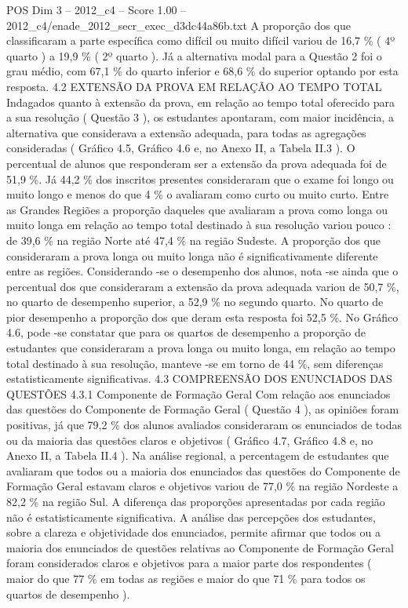 \begin{textsample}{POS Dim 3 – 2012\_c4 – Score 1.00 – 2012\_c4/enade\_2012\_secr\_exec\_d3dc44a86b.txt}
A proporção dos que classificaram a parte específica como difícil ou muito difícil variou de 16,7 \% ( 4º quarto ) a 19,9 \% ( 2º quarto ).
Já a alternativa modal para a Questão 2 foi o grau médio, com 67,1 \% do quarto inferior e 68,6 \% do superior optando por esta resposta. 4.2 EXTENSÃO DA PROVA EM RELAÇÃO AO TEMPO TOTAL Indagados quanto à extensão da prova, em relação ao tempo total oferecido para a sua resolução ( Questão 3 ), os estudantes apontaram, com maior incidência, a alternativa que considerava a extensão adequada, para todas as agregações consideradas ( Gráfico 4.5, Gráfico 4.6 e, no Anexo II, a Tabela II.3 ).
O percentual de alunos que responderam ser a extensão da prova adequada foi de 51,9 \%.
Já 44,2 \% dos inscritos presentes consideraram que o exame foi longo ou muito longo e menos do que 4 \% o avaliaram como curto ou muito curto.
Entre as Grandes Regiões a proporção daqueles que avaliaram a prova como longa ou muito longa em relação ao tempo total destinado à sua resolução variou pouco : de 39,6 \% na região Norte até 47,4 \% na região Sudeste.
A proporção dos que consideraram a prova longa ou muito longa não é significativamente diferente entre as regiões.
Considerando -se o desempenho dos alunos, nota -se ainda que o percentual dos que consideraram a extensão da prova adequada variou de 50,7 \%, no quarto de desempenho superior, a 52,9 \% no segundo quarto.
No quarto de pior desempenho a proporção dos que deram esta resposta foi 52,5 \%.
No Gráfico 4.6, pode -se constatar que para os quartos de desempenho a proporção de estudantes que consideraram a prova longa ou muito longa, em relação ao tempo total destinado à sua resolução, manteve -se em torno de 44 \%, sem diferenças estatisticamente significativas. 4.3 COMPREENSÃO DOS ENUNCIADOS DAS QUESTÕES 4.3.1 Componente de Formação Geral Com relação aos enunciados das questões do Componente de Formação Geral ( Questão 4 ), as opiniões foram positivas, já que 79,2 \% dos alunos avaliados consideraram os enunciados de todas ou da maioria das questões claros e objetivos ( Gráfico 4.7, Gráfico 4.8 e, no Anexo II, a Tabela II.4 ).
Na análise regional, a percentagem de estudantes que avaliaram que todos ou a maioria dos enunciados das questões do Componente de Formação Geral estavam claros e objetivos variou de 77,0 \% na região Nordeste a 82,2 \% na região Sul.
A diferença das proporções apresentadas por cada região não é estatisticamente significativa.
A análise das percepções dos estudantes, sobre a clareza e objetividade dos enunciados, permite afirmar que todos ou a maioria dos enunciados de questões relativas ao Componente de Formação Geral foram considerados claros e objetivos para a maior parte dos respondentes ( maior do que 77 \% em todas as regiões e maior do que 71 \% para todos os quartos de desempenho ).

\end{textsample}

